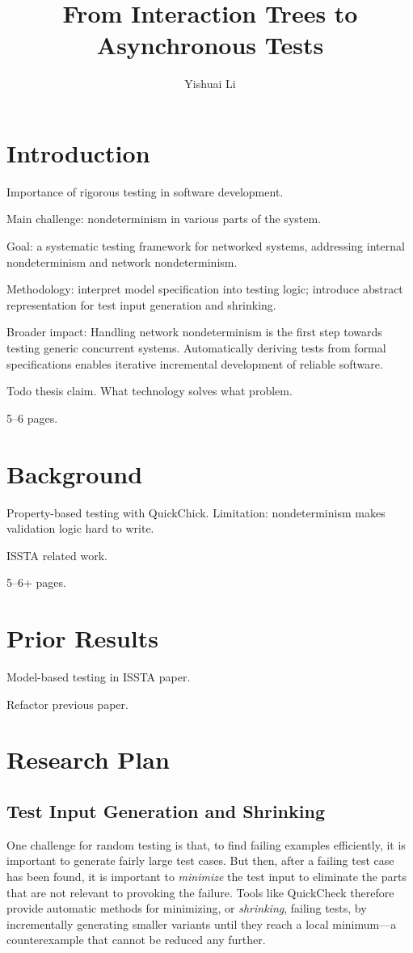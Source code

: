\documentclass{article}
\title{From Interaction Trees to Asynchronous Tests}
\author{Yishuai Li}
\begin{document}
\maketitle
\section{Introduction}
Importance of rigorous testing in software development.

Main challenge: nondeterminism in various parts of the system.

Goal: a systematic testing framework for networked systems, addressing internal
nondeterminism and network nondeterminism.

Methodology: interpret model specification into testing logic; introduce
abstract representation for test input generation and shrinking.

Broader impact: Handling network nondeterminism is the first step towards
testing generic concurrent systems.  Automatically deriving tests from formal
specifications enables iterative incremental development of reliable software.

Todo thesis claim.  What technology solves what problem.

5--6 pages.

\section{Background}
Property-based testing with QuickChick.  Limitation: nondeterminism makes
validation logic hard to write.

ISSTA related work.

5--6+ pages.

\section{Prior Results}
Model-based testing in ISSTA paper.

Refactor previous paper.

\section{Research Plan}
\subsection{Test Input Generation and Shrinking}

One challenge for random testing is that, to find failing examples efficiently,
it is important to generate fairly large test cases.  But then, after a failing
test case has been found, it is important to \textit{minimize} the test input to
eliminate the parts that are not relevant to provoking the failure.  Tools like
QuickCheck therefore provide automatic methods for minimizing, or {\em
  shrinking}, failing tests, by incrementally generating smaller variants until
they reach a local minimum---a counterexample that cannot be reduced any
further.
\end{document}
